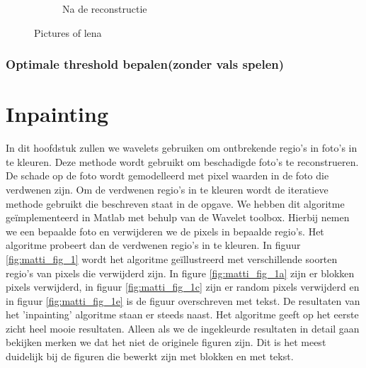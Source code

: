 \begin{figure}
\begin{subfigure}[b]{0.45\textwidth}
        \caption{Na de reconstructie}
        \label{fig:mouse}
    \end{subfigure}
    \caption{Pictures of lena}\label{fig:optimaleRuisBIOR}
\end{figure}


\subsubsection{Optimale threshold bepalen(zonder vals spelen)}




\section{Inpainting}

In dit hoofdstuk zullen we wavelets gebruiken om ontbrekende regio's in foto's in te kleuren. Deze methode wordt gebruikt om beschadigde foto's te reconstrueren. De schade op de foto wordt gemodelleerd met pixel waarden in de foto die verdwenen zijn. Om de verdwenen regio's in te kleuren wordt de iteratieve methode gebruikt die beschreven staat in de opgave. We hebben dit algoritme ge\"{i}mplementeerd in Matlab met behulp van de Wavelet toolbox. Hierbij nemen we een bepaalde foto en verwijderen we de pixels in bepaalde regio's. Het algoritme probeert dan de verdwenen regio's in te kleuren. 
\newline
\newline
In figuur \ref{fig:matti_fig_1} wordt het algoritme ge\"{i}llustreerd met verschillende soorten regio's van pixels die verwijderd zijn. In figure \ref{fig:matti_fig_1a} zijn er blokken pixels verwijderd, in figuur \ref{fig:matti_fig_1c} zijn er random pixels verwijderd en in figuur \ref{fig:matti_fig_1e} is de figuur overschreven met tekst. De resultaten van het 'inpainting' algoritme staan er steeds naast. Het algoritme geeft op het eerste zicht heel mooie resultaten. Alleen als we de ingekleurde resultaten in detail gaan bekijken merken we dat het niet de originele figuren zijn. Dit is het meest duidelijk bij de figuren die bewerkt zijn met blokken en met tekst.


